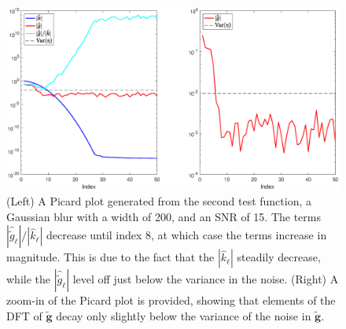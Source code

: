 \documentclass[12pt,notitlepage]{report}
\newcommand{\gnoise}{\widetilde{g}}	%
\newcommand{\gnoiseVec}{\widetilde{\mathbf{g}}}	%
\begin{document}
\begin{figure}[htb]
	\centerline{\includegraphics[scale = 0.45]{Figures/PicardPlot1D_F2_S15_W200.eps}}
\caption{(Left) A Picard plot generated from the second test function, a Gaussian blur with a width of 200, and an SNR of 15. The terms $|\widehat{\gnoise}_\ell|/|\widehat{k}_\ell|$ decrease until index 8, at which case the terms increase in magnitude. This is due to the fact that the $|\widehat{k}_\ell|$ steadily decrease, while the $|\widehat{\gnoise}_\ell|$ level off just below the variance in the noise. (Right) A zoom-in of the Picard plot is provided, showing that elements of the DFT of $\gnoiseVec$ decay only slightly below the variance of the noise in $\gnoiseVec$.}
\label{PicardPlot}
\end{figure}
\end{document}
